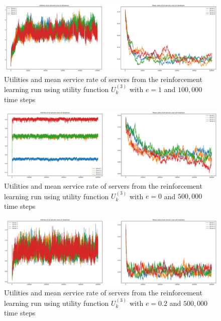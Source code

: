 \begin{figure}[H]
    \includegraphics[width=\textwidth]{chapters/00_appendix/03_more_rl_results/Bin/utility_3_eps/u3_1_e1.eps}
    \caption{Utilities and mean service rate of servers from the reinforcement
    learning run using utility function \(U_k^{(3)}\) with \(e = 1\) and
    \(100,\!000\) time steps}
    \label{fig:RL_utility3_1_e1}
\end{figure}

\begin{figure}[H]
    \includegraphics[width=\textwidth]{chapters/00_appendix/03_more_rl_results/Bin/utility_3_eps/u3_2_e0.eps}
    \caption{Utilities and mean service rate of servers from the reinforcement
    learning run using utility function \(U_k^{(3)}\) with \(e = 0\) and
    \(500,\!000\) time steps}
    \label{fig:RL_utility3_2_e0}
\end{figure}

\begin{figure}[H]
    \includegraphics[width=\textwidth]{chapters/00_appendix/03_more_rl_results/Bin/utility_3_eps/u3_2_e02.eps}
    \caption{Utilities and mean service rate of servers from the reinforcement
    learning run using utility function \(U_k^{(3)}\) with \(e = 0.2\) and
    \(500,\!000\) time steps}
    \label{fig:RL_utility3_2_e02}
\end{figure}

